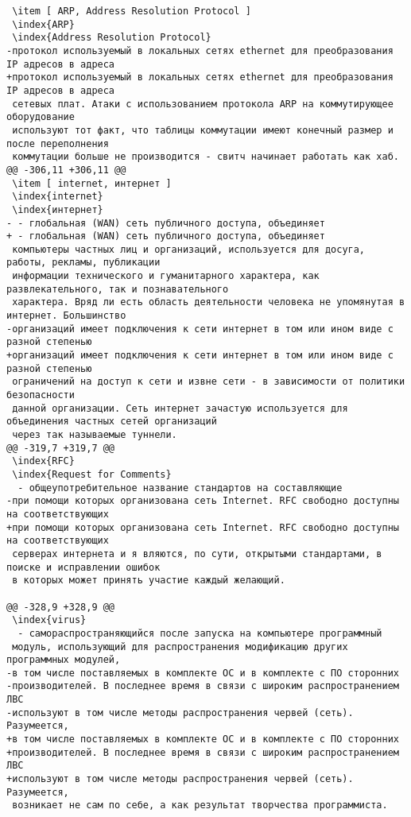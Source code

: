 \begin{verbatim}
 \item [ ARP, Address Resolution Protocol ]
 \index{ARP}
 \index{Address Resolution Protocol}
-протокол используемый в локальных сетях ethernet для преобразования IP адресов в адреса
+протокол используемый в локальных сетях ethernet для преобразования IP адресов в адреса
 сетевых плат. Атаки с использованием протокола ARP на коммутирующее оборудование
 используют тот факт, что таблицы коммутации имеют конечный размер и после переполнения
 коммутации больше не производится - свитч начинает работать как хаб.
@@ -306,11 +306,11 @@
 \item [ internet, интернет ]
 \index{internet}
 \index{интернет}
- - глобальная (WAN) сеть публичного доступа, объединяет
+ - глобальная (WAN) сеть публичного доступа, объединяет
 компьютеры частных лиц и организаций, используется для досуга, работы, рекламы, публикации
 информации технического и гуманитарного характера, как развлекательного, так и познавательного
 характера. Вряд ли есть область деятельности человека не упомянутая в интернет. Большинство
-организаций имеет подключения к сети интернет в том или ином виде с разной степенью
+организаций имеет подключения к сети интернет в том или ином виде с разной степенью
 ограничений на доступ к сети и извне сети - в зависимости от политики безопасности
 данной организации. Сеть интернет зачастую используется для объединения частных сетей организаций
 через так называемые туннели.
@@ -319,7 +319,7 @@
 \index{RFC}
 \index{Request for Comments}
  - общеупотребительное название стандартов на составляющие
-при помощи которых организована сеть Internet. RFC свободно доступны на соответствующих
+при помощи которых организована сеть Internet. RFC свободно доступны на соответствующих
 серверах интернета и я вляются, по сути, открытыми стандартами, в поиске и исправлении ошибок
 в которых может принять участие каждый желающий.

@@ -328,9 +328,9 @@
 \index{virus}
  - самораспространяющийся после запуска на компьютере программный
 модуль, использующий для распространения модификацию других программных модулей,
-в том числе поставляемых в комплекте ОС и в комплекте с ПО сторонних
-производителей. В последнее время в связи с широким распространением ЛВС
-используют в том числе методы распространения червей (сеть). Разумеется,
+в том числе поставляемых в комплекте ОС и в комплекте с ПО сторонних
+производителей. В последнее время в связи с широким распространением ЛВС
+используют в том числе методы распространения червей (сеть). Разумеется,
 возникает не сам по себе, а как результат творчества программиста.


\end{verbatim}
